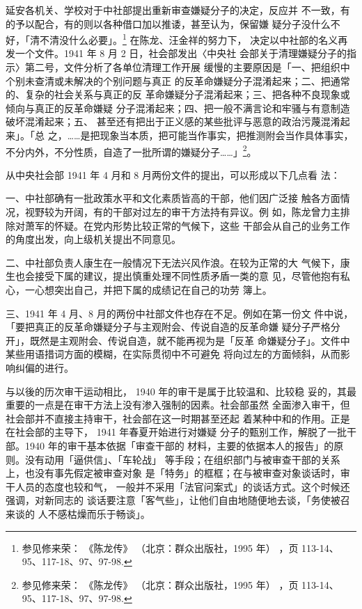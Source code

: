 延安各机关、学校对于中社部提出重新审查嫌疑分子的决定，反应并
不一致，有的予以配合，有的则以各种借口加以推诿，甚至认为，保留嫌
疑分子没什么不好，「清不清没什么必要」。\footnote{参见修来荣：
《陈龙传》
（北京：群众出版社，1995 年）
，页 113-14、95、117-18、97、97-98.} 在陈龙、汪金祥的努力下，
决定以中社部的名义再发一个文件。1941 年 8 月 2 日，社会部发出〈中央社
会部关于清理嫌疑分子的指示〉第二号，文件分析了各单位清理工作开展
缓慢的主要原因是「一、把组织中个别未查清或未解决的个别问题与真正
的反革命嫌疑分子混淆起来；二、把通常的、复杂的社会关系与真正的反
革命嫌疑分子混淆起来；三、把各种不良现象或倾向与真正的反革命嫌疑
分子混淆起来；四、把一般不满言论和牢骚与有意制造破坏混淆起来；五、
甚至还有把出于正义感的某些批评与恶意的政治污蔑混淆起来」。「总
之，……是把现象当本质，把可能当作事实，把推测附会当作具体事实，
不分内外，不分性质，自造了一批所谓的嫌疑分子……」\footnote{参见修来荣：
《陈龙传》
（北京：群众出版社，1995 年）
，页 113-14、95、117-18、97、97-98.}。

从中央社会部 1941 年 4 月和 8 月两份文件的提出，可以形成以下几点看
法：

一、中社部确有一批政策水平和文化素质皆高的干部，他们因广泛接
触各方面情况，视野较为开阔，有的干部对过左的审干方法持有异议。例
如，陈龙曾力主排除对萧军的怀疑。在党内形势比较正常的气候下，这些
干部会从自己的业务工作的角度出发，向上级机关提出不同意见。

二、中社部负责人康生在一般情况下无法兴风作浪。在较为正常的大
气候下，康生也会接受下属的建议，提出慎重处理不同性质矛盾一类的意
见，尽管他抱有私心，一心想突出自己，并把下属的成绩记在自己的功劳
簿上。

三、1941 年 4 月、8 月的两份中社部文件也存在不足。例如在第一份文
件中说，「要把真正的反革命嫌疑分子与主观附会、传说自造的反革命嫌
疑分子严格分开」，既然是主观附会、传说自造，就不能再视为是「反革
命嫌疑分子」。文件中某些用语措词方面的模糊，在实际贯彻中不可避免
将向过左的方面倾斜，从而影响纠偏的进行。

与以後的历次审干运动相比， 1940 年的审干是属于比较温和、比较稳
妥的，其最重要的一点是在审干方法上没有渗入强制的因素。社会部虽然
全面渗入审干，但社会部并不直接主持审干，社会部在这一时期甚至还起
着某种中和的作用。正是在社会部的主导下， 1941 年春夏开始进行对嫌疑
分子的甄别工作，解脱了一批干部。1940 年的审干基本依据「审查干部的
材料，主要的依据本人的报告」的原则。没有动用「逼供信」、「车轮战」
等手段；在组织部门与被审查干部的关系上，也没有事先假定被审查对象
是「特务」的框框；在与被审查对象谈话时，审干人员的态度也较和气，
一般并不采用「法官问案式」的谈话方式。这个时候还强调，对新同志的
谈话要注意「客气些」，让他们自由地随便地去谈，「务使被召来谈的
人不感枯燥而乐于畅谈」。

